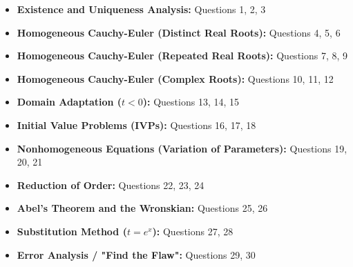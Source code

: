 \documentclass[11pt]{article}
\begin{document}
\begin{itemize}[label=\checkmark]
    \item \textbf{Existence and Uniqueness Analysis:} Questions 1, 2, 3
    \item \textbf{Homogeneous Cauchy-Euler (Distinct Real Roots):} Questions 4, 5, 6
    \item \textbf{Homogeneous Cauchy-Euler (Repeated Real Roots):} Questions 7, 8, 9
    \item \textbf{Homogeneous Cauchy-Euler (Complex Roots):} Questions 10, 11, 12
    \item \textbf{Domain Adaptation ($t < 0$):} Questions 13, 14, 15
    \item \textbf{Initial Value Problems (IVPs):} Questions 16, 17, 18
    \item \textbf{Nonhomogeneous Equations (Variation of Parameters):} Questions 19, 20, 21
    \item \textbf{Reduction of Order:} Questions 22, 23, 24
    \item \textbf{Abel's Theorem and the Wronskian:} Questions 25, 26
    \item \textbf{Substitution Method ($t = e^x$):} Questions 27, 28
    \item \textbf{Error Analysis / "Find the Flaw":} Questions 29, 30
\end{itemize}
\end{document}
